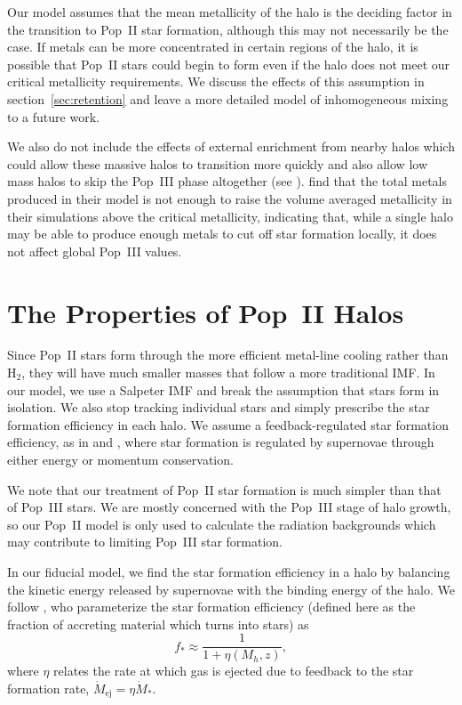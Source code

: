 \documentclass[a4paper,fleqn,usenatbib]{mnras}
\begin{document}
Our 
model assumes that the mean metallicity of the halo is the deciding factor in the transition to Pop~II star formation, although this may not necessarily be the case. If metals can be more concentrated in certain regions of the halo, it is possible that Pop~II stars could begin to form even if the halo does not meet our critical metallicity requirements. We discuss the effects of this assumption in section~\ref{sec:retention} and leave a more detailed model of inhomogeneous mixing to a future work.

We also do not include the effects of external enrichment from nearby halos which could allow these massive halos to transition more quickly and also allow low mass halos to skip the Pop~III phase altogether (see \citealt{smith_2015}). \citet{jaacks_2017} find that the total metals produced in their model is not enough to raise the volume averaged metallicity in their simulations above the critical metallicity, indicating that, while a single halo may be able to produce enough metals to cut off star formation locally, it does not affect global Pop~III values.

\section{The Properties of Pop~II Halos}
\label{sec:II}

Since Pop~II stars form through the more efficient metal-line cooling rather than H$_2$, they will have much smaller masses that follow a more traditional IMF. In our model, we use a Salpeter IMF and break the assumption that stars form in isolation. We also stop tracking individual stars and simply 
prescribe the star formation efficiency in each halo. We assume a feedback-regulated star formation 
efficiency, as in \citet{furlanetto_2016} and \citet{sun_2015}, where star formation is regulated by supernovae through either energy or momentum conservation.

We note that our treatment of Pop~II star formation is much simpler than that of Pop~III stars. We are mostly concerned with the Pop~III stage of halo growth, so our Pop~II model is only used to calculate the radiation backgrounds which may contribute to limiting Pop~III star formation.

In our fiducial model, we find the star formation efficiency in a halo by balancing the kinetic energy released by supernovae with the binding energy of the halo. We follow \citet{furlanetto_2016}, who parameterize the star formation efficiency (defined here as the fraction of accreting material which turns into stars) as
\begin{equation}
f_\ast \approx \frac{1}{1 + \eta \left( M_h, z\right)},
\end{equation}
where $\eta$ relates the rate at which gas is ejected due to feedback to the star formation rate, $\dot{M}_{\text{ej}} = \eta \dot{M}_\ast$.
\end{document}
